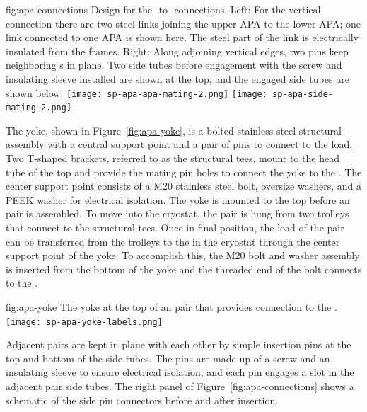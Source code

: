 \begin{dunefigure}{fig:apa-connections}
{Design for the -to- connections.  Left: For the vertical connection there are two steel links joining the upper APA to the lower APA; one link connected to one APA is shown here.  The steel part of the link is electrically insulated from the frames.  Right: Along adjoining vertical edges, two pins keep neighboring s in plane. Two side tubes before engagement with the screw and insulating sleeve installed are shown at the top, and the engaged side tubes are shown below.}  
\texttt{[image: sp-apa-apa-mating-2.png]} \qquad
\texttt{[image: sp-apa-side-mating-2.png]}
\end{dunefigure}

The  yoke, shown in Figure~\ref{fig:apa-yoke}, is a bolted stainless steel structural assembly with a central support point and a pair of pins to connect to the load.  Two T-shaped brackets, referred to as the structural tees, mount to the head tube of the top  and provide the mating pin holes to connect the yoke to the .  The center support point consists of a M20 stainless steel bolt, oversize washers, and a PEEK washer for electrical isolation.   The yoke is mounted to the top  before an  pair %
is assembled.  To move into the cryostat, the pair %
is hung from two trolleys that connect to the structural tees. Once in final position, the load of the  pair %
can be transferred from the trolleys to the  in the cryostat through the center support point of the yoke.  To accomplish this, the M20 bolt and washer assembly is inserted from the bottom of the yoke and the threaded end of the bolt connects to the .

\begin{dunefigure}{fig:apa-yoke} %
{The yoke at the top of an  pair %
that provides connection to the .}
\texttt{[image: sp-apa-yoke-labels.png]} 
\end{dunefigure}

Adjacent  pairs %
are kept in plane with each other by simple insertion pins at the top and bottom of the side tubes.  The pins are made up of a screw and an insulating sleeve to ensure electrical isolation, and each pin engages a slot in the adjacent  pair %
side tubes. The right panel of Figure~\ref{fig:apa-connections} shows a schematic of the side pin connectors before and after insertion.  

